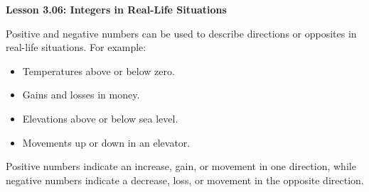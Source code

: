 \begin{center}
\textbf{Lesson 3.06: Integers in Real-Life Situations}
\end{center}

\vspace*{-1.5ex}

Positive and negative numbers can be used to describe directions or opposites in real-life situations. For example:
\begin{itemize}
    \item Temperatures above or below zero.
    \item Gains and losses in money.
    \item Elevations above or below sea level.
    \item Movements up or down in an elevator.
\end{itemize}

\noindent Positive numbers indicate an increase, gain, or movement in one direction, while negative numbers indicate a decrease, loss, or movement in the opposite direction.


